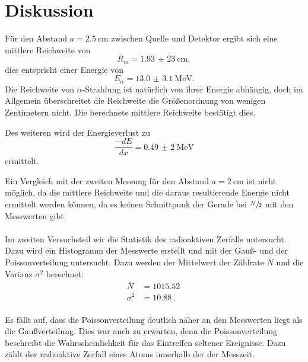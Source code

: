 \section{Diskussion}
\label{sec:Diskussion}
Für den Abstand $a=\SI{2,5}{\cm}$ zwischen Quelle und Detektor ergibt sich eine
mittlere Reichweite von
\begin{equation}
 R_m=\SI{1,93(23)}{\cm},
\end{equation}
dies entspricht einer Energie von
\begin{equation}
 E_{\alpha}=\SI{13.0(31)}{\MeV}.
\end{equation}
Die Reichweite von $\alpha$-Strahlung ist natürlich von ihrer Energie abhängig, doch im
Allgemein überschreitet die Reichweite die Größenordnung von wenigen Zentimetern nicht.
Die berechnete mittlere Reichweite bestätigt dies.

Des weiteren wird der Energieverlust zu
\begin{equation}
  \frac{-dE}{dx}=\SI{0,49(2)}{\MeV}
\end{equation}
ermittelt.

Ein Vergleich mit der zweiten Messung für den Abstand $a=\SI{2}{\cm}$ ist nicht
möglich, da die mittlere Reichweite und die daraus resultierende
Energie nicht ermittelt werden können, da es keinen Schnittpunk der Gerade bei
$\sfrac{N}{2}$ mit den Messwerten gibt.
\\
\\
Im zweiten Versuchsteil wir die Statistik des radioaktiven Zerfalls untersucht.
Dazu wird ein Histogramm der Messwerte erstellt und mit der
Gauß- und der Poissonverteilung untersucht. Dazu werden der Mittelwert der Zählrate
$\bar{N}$ und die Varianz $\sigma^2$ berechnet:
  \begin{align*}
    \bar{N}&=\SI{1015.52}{}\\
    \sigma^{2}&=\SI{10.88}{}.\\
  \end{align*}

Es fällt auf, dass die Poissonverteilung
deutlich näher an den Messwerten liegt als die Gaußverteilung. Dies war auch zu erwarten, denn
die Poissonverteilung beschreibt die Wahrscheinlichkeit für das Eintreffen seltener
Ereignisse. Dazu zählt der radioaktive Zerfall eines Atoms innerhalb der der Messzeit.

